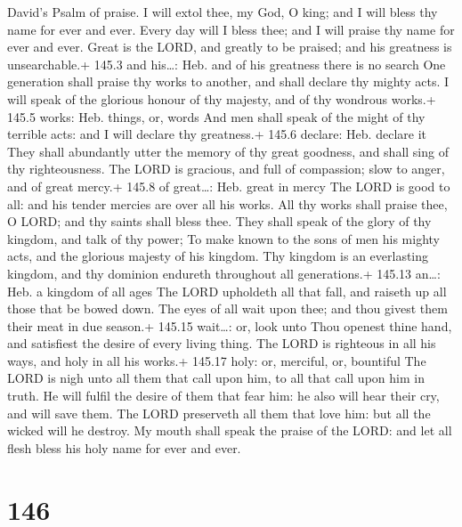 David's Psalm of praise.  I will extol thee, my God, O king;
and I will bless thy name for ever and ever.  Every day will
I bless thee; and I will praise thy name for ever and ever. 
Great is the LORD, and greatly to be praised; and his greatness is
unsearchable.+ 145.3 and his\ldots: Heb. and of his greatness there is
no search  One generation shall praise thy works to another,
and shall declare thy mighty acts.  I will speak of the
glorious honour of thy majesty, and of thy wondrous works.+ 145.5 works:
Heb. things, or, words  And men shall speak of the might of
thy terrible acts: and I will declare thy greatness.+ 145.6 declare:
Heb. declare it  They shall abundantly utter the memory of
thy great goodness, and shall sing of thy righteousness. 
The LORD is gracious, and full of compassion; slow to anger, and of
great mercy.+ 145.8 of great\ldots: Heb. great in mercy  The
LORD is good to all: and his tender mercies are over all his works.
 All thy works shall praise thee, O LORD; and thy saints
shall bless thee.  They shall speak of the glory of thy
kingdom, and talk of thy power;  To make known to the sons
of men his mighty acts, and the glorious majesty of his kingdom.
 Thy kingdom is an everlasting kingdom, and thy dominion
endureth throughout all generations.+ 145.13 an\ldots: Heb. a kingdom of
all ages  The LORD upholdeth all that fall, and raiseth up
all those that be bowed down.  The eyes of all wait upon
thee; and thou givest them their meat in due season.+ 145.15 wait\ldots:
or, look unto  Thou openest thine hand, and satisfiest the
desire of every living thing.  The LORD is righteous in all
his ways, and holy in all his works.+ 145.17 holy: or, merciful, or,
bountiful  The LORD is nigh unto all them that call upon
him, to all that call upon him in truth.  He will fulfil
the desire of them that fear him: he also will hear their cry, and will
save them.  The LORD preserveth all them that love him: but
all the wicked will he destroy.  My mouth shall speak the
praise of the LORD: and let all flesh bless his holy name for ever and
ever.

\hypertarget{section-146}{%
\section{146}\label{section-146}}

